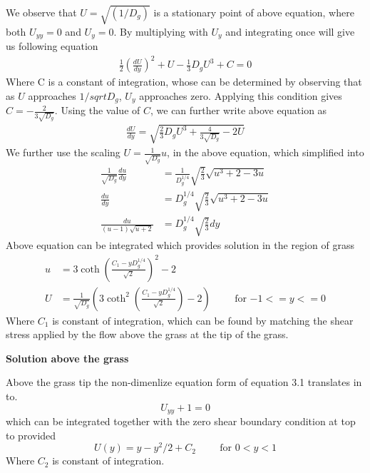 \documentclass[letterpaper,10pt]{article}
\begin{document}
We observe that $U = \sqrt{(1/D_g)}$ is a stationary point of above equation, where both $U_{yy}=0$ and $U_y =0 $. By multiplying with $U_y$ and integrating once will give us following equation
\begin{equation}
\begin{split}
 \frac{1}{2} \left( \frac{dU}{dy} \right)^2 +U - \frac{1}{3} D_g U^3 + C = 0
\end{split}
\end{equation}
Where C is a constant of integration, whose can be determined by observing that as $U$ approaches $1/sqrt{D_g}$, $U_y$ approaches zero. Applying this condition gives $C = -\frac{2}{3\sqrt{D_g}}$. Using the value of $C$, we can further write above equation as 
\begin{equation}
\begin{split}
 \frac{dU}{dy} = \sqrt{\frac{2}{3}D_g U^3+\frac{4}{3\sqrt{D_g}}-2U }
\end{split}
\end{equation}
We further use the scaling $U=\frac{1}{\sqrt{D_g}} u $, in the above equation, which simplified into 
\begin{equation}
\begin{split}
 \frac{1}{\sqrt{D_g}}\frac{du}{dy} &= \frac{1}{D_g^{1/4}}\sqrt{\frac{2}{3}} \sqrt{ u^3+2-3u } \\
 \frac{du}{dy} &= {D_g^{1/4}}\sqrt{\frac{2}{3}} \sqrt{ u^3+2-3u } \\
 \frac{du}{(u-1)\sqrt{u+2} } &= {D_g^{1/4}}\sqrt{\frac{2}{3}} dy
\end{split}
\end{equation}
Above equation can be integrated which provides solution in the region of grass
\begin{equation}
\begin{split}
u &= 3 \coth \left(\frac{C_1-y D_g^{1/4}}{\sqrt{2}}  \right)^2-2 \\
U &= \frac{1}{\sqrt{D_g}} \left( 3 \coth^2 \left(\frac{C_1-y D_g^{1/4}}{\sqrt{2}}  \right)-2    \right) \hspace{1cm} \text{for $-1<=y<=0$}
\label{under_grass_sol}
\end{split}
\end{equation}
Where $C_1$ is constant of integration, which can be found by matching the shear stress applied by the flow above the grass at the tip of the grass.

\textbf{Solution above the grass}

Above the grass tip the non-dimenlize equation form of equation 3.1 translates in to.
\begin{equation}
 U_{yy}+1=0
\end{equation}
which can be integrated together with the zero shear boundary condition at top to provided
\begin{equation}
 U(y) = y-y^2/2+C_2 \hspace{1cm} \text{for $0<y<1$}
 \label{above_grass_sol}
\end{equation}
Where $C_2$ is constant of integration.
\end{document}
